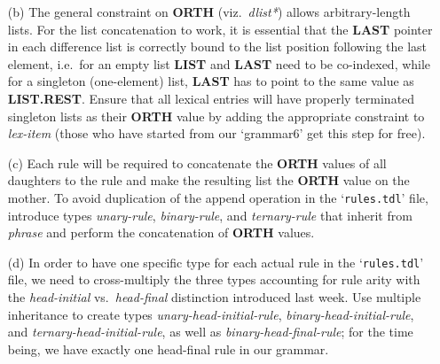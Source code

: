 \documentclass[10pt]{article}
\newcommand{\att}[1]{{\mbox{\scriptsize {\bf #1}}}}
\begin{document}
\begin{enumerate}
\begin{itemize}
          \item [(b)]
                The general constraint on \att{ORTH} (viz.\
                {\it *dlist*}) allows arbitrary-length lists.  For the
                list concatenation to work, it is essential that the
                \att{LAST} pointer in each difference list is correctly
                bound to the list position following the last element,
                i.e.\ for an empty list \att{LIST} and \att{LAST} need
                to be co-indexed, while for a singleton (one-element)
                list, \att{LAST} has to point to the same value as
                \att{LIST.REST}.
                Ensure that all lexical entries will have properly
                terminated singleton lists as their \att{ORTH} value by
                adding the appropriate constraint to {\it lex-item}
                (those who have started from our `grammar6' get this
                step for free). 
          \item [(c)]
                Each rule will be required to concatenate the
                \att{ORTH} values of all daughters to the rule and make
                the resulting list the \att{ORTH} value on the mother.
                To avoid duplication of the append operation in the
                `{\tt rules.tdl}' file, introduce types
                {\it unary-rule}, {\it binary-rule}, and
                {\it ternary-rule} that inherit from {\it phrase} and
                perform the concatenation of \att{ORTH} values.
          \item [(d)]
                In order to have one specific type for each actual rule
                in the `{\tt rules.tdl}' file, we need to
                cross-multiply the three types accounting for rule
                arity with the {\it head-initial} vs.\
                {\it head-final} distinction introduced last week.
                Use multiple inheritance to create types
                {\it unary-head-initial-rule},
                {\it binary-head-initial-rule}, and
                {\it ternary-head-initial-rule}, as well as
                {\it binary-head-final-rule}; for the time being, we
                have exactly one head-final rule in our
                grammar.

\end{itemize}
\end{enumerate}
\end{document}
